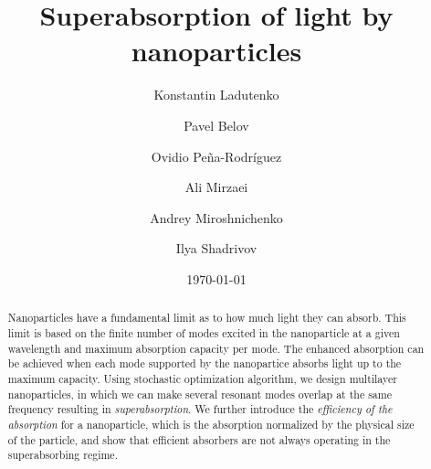 \documentclass[aps,prl,twocolumn,showpacs,superscriptaddress,groupedaddress]{revtex4-1}
\begin{document}

\title{Superabsorption of light by nanoparticles} %
\author{Konstantin Ladutenko} 


\author{Pavel Belov} 

\author{Ovidio Pe\~{n}a-Rodr\'{i}guez} 

\author{Ali Mirzaei} \author{Andrey Miroshnichenko} \author{Ilya
  Shadrivov} 

\date{\today}

\begin{abstract}
  Nanoparticles have a fundamental limit as to how much light they can
  absorb. This limit is based on the finite number of modes excited
  in the nanoparticle at a given wavelength and maximum absorption
  capacity per mode. The enhanced absorption can be achieved when each
  mode supported by the nanopartice absorbs light up to the maximum
  capacity. Using stochastic optimization algorithm, we design
  multilayer nanoparticles, in which we can make several resonant
  modes overlap at the same frequency resulting in {\it
    superabsorption}.  We further introduce the {\it efficiency of the
    absorption} for a nanoparticle, which is the absorption normalized
  by the physical size of the particle, and show that efficient
  absorbers are not always operating in the superabsorbing regime.
\end{abstract}
\end{document}
